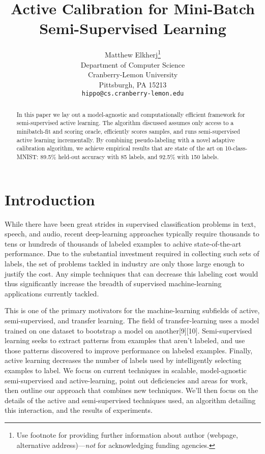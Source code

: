 \documentclass{article}
\title{Active Calibration for Mini-Batch Semi-Supervised Learning}
\author{
  Matthew Elkherj\thanks{Use footnote for providing further
    information about author (webpage, alternative
    address)---\emph{not} for acknowledging funding agencies.} \\
  Department of Computer Science\\
  Cranberry-Lemon University\\
  Pittsburgh, PA 15213 \\
  \texttt{hippo@cs.cranberry-lemon.edu} \\
}
\begin{document}

\maketitle

\begin{abstract}
In this paper we lay out a model-agnostic and computationally efficient framework for semi-supervised active learning.  The algorithm discussed assumes only access to a minibatch-fit and scoring oracle, efficiently scores samples, and runs semi-supervised active learning incrementally.  By combining pseudo-labeling with a novel adaptive calibration algorithm, we achieve empirical results that are state of the art on 10-class-MNIST: 89.5\% held-out accuracy with 85 labels, and 92.5\% with 150 labels.  
\end{abstract}

\section{Introduction}
While there have been great strides in supervised classification problems in text, speech, and audio, recent deep-learning approaches typically require thousands to tens or hundreds of thousands of labeled examples to achive state-of-the-art performance.  Due to the substantial investment required in collecting such sets of labels, the set of problems tackled in industry are only those large enough to justify the cost.  Any simple techniques that can decrease this labeling cost would thus significantly increase the breadth of supervised machine-learning applications currently tackled.  

This is one of the primary motivators for the machine-learning subfields of active, semi-supervised, and transfer learning.  The field of transfer-learning uses a model trained on one dataset to bootstrap a model on another[9][10].  Semi-supervised learning seeks to extract patterns from examples that aren't labeled, and use those patterns discovered to improve performance on labeled examples.  Finally, active learning decreases the number of labels used by intelligently selecting examples to label.  We focus on current techniques in scalable, model-agnostic semi-supervised and active-learning, point out deficiencies and areas for work, then outline our approach that combines new techniques.  We'll then focus on the details of the active and semi-supervised techniques used, an algorithm detailing this interaction, and the results of experiments.  
\end{document}
